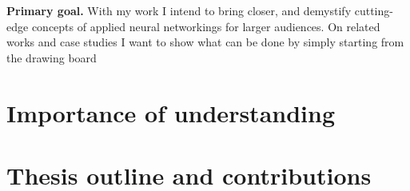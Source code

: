 \textbf{Primary goal.} With my work I intend to bring closer, and demystify cutting-edge concepts of applied neural networkings for larger audiences. 
On related works and case studies I want to show what can be done by simply starting from the drawing board

\section{Importance of understanding}
\section{Thesis outline and contributions}






%
